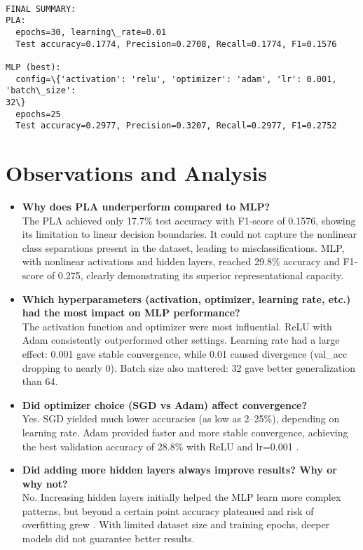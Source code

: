 \documentclass[11pt]{article}
\begin{document}
    \begin{Verbatim}[commandchars=\\\{\}]

FINAL SUMMARY:
PLA:
  epochs=30, learning\_rate=0.01
  Test accuracy=0.1774, Precision=0.2708, Recall=0.1774, F1=0.1576

MLP (best):
  config=\{'activation': 'relu', 'optimizer': 'adam', 'lr': 0.001, 'batch\_size':
32\}
  epochs=25
  Test accuracy=0.2977, Precision=0.3207, Recall=0.2977, F1=0.2752
    \end{Verbatim}
    
\vspace{0.5cm} 
\section{Observations and Analysis} 
\begin{itemize} 
    \item \textbf{Why does PLA underperform compared to MLP?} \\
    The PLA achieved only 17.7\% test accuracy with F1-score of 0.1576, showing its limitation to linear decision boundaries. It could not capture the nonlinear class separations present in the dataset, leading to misclassifications. MLP, with nonlinear activations and hidden layers, reached 29.8\% accuracy and F1-score of 0.275, clearly demonstrating its superior representational capacity.

    \item \textbf{Which hyperparameters (activation, optimizer, learning rate, etc.) had the most impact on MLP performance?} \\
    The activation function and optimizer were most influential. ReLU with Adam consistently outperformed other settings. Learning rate had a large effect: 0.001 gave stable convergence, while 0.01 caused divergence (val\_acc dropping to nearly 0). Batch size also mattered: 32 gave better generalization than 64.

    \item \textbf{Did optimizer choice (SGD vs Adam) affect convergence?} \\
Yes. SGD yielded much lower accuracies (as low as 2--25\%), depending on learning rate. 
Adam provided faster and more stable convergence, achieving the best validation accuracy 
of 28.8\% with ReLU and lr=0.001 \cite{zhang2019adam}.


    \item \textbf{Did adding more hidden layers always improve results? Why or why not?} \\
No. Increasing hidden layers initially helped the MLP learn more complex patterns, but beyond a certain point accuracy plateaued and risk of overfitting grew \cite{uzair2020hidden}. With limited dataset size and training epochs, deeper models did not guarantee better results.



\end{itemize}
\end{document}
